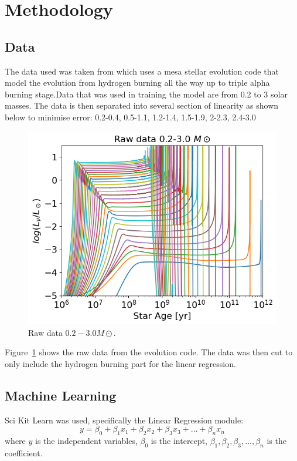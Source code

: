 \section{Methodology}

\subsection{Data}
 

The data used was taken from  which uses a mesa stellar evolution code that model the evolution from hydrogen burning all the way up to triple alpha burning stage.Data that was used in training the model are from 0.2 to 3 solar masses. The data is then separated into several section of linearity as shown below to minimise error:
0.2-0.4, 0.5-1.1, 1.2-1.4, 1.5-1.9, 2-2.3, 2.4-3.0


\begin{figure}[H]
	\centering
	\includegraphics[width=\textwidth,height=\textheight]{assets/raw.png}
	\caption{Raw data $0.2-3.0 M\odot$.}
	\label{fig:raw}
\end{figure}

Figure~\ref{fig:raw}
shows the raw data from the evolution code. The data was then cut to only include the hydrogen burning part for the linear regression.

\subsection{Machine Learning}
Sci Kit Learn was used, specifically the Linear Regression module:
\begin{equation}
    y=\beta_{0}+\beta_{1}x_1+\beta_{2}x_2+\beta_{3}x_3+...+\beta_{n}x_n
\end{equation}
where 
$y$ is the independent variables, $\beta_0$ is the intercept, $\beta_{1}, \beta_{2}, \beta_{3},..., \beta_{n}$ is the coefficient. 

